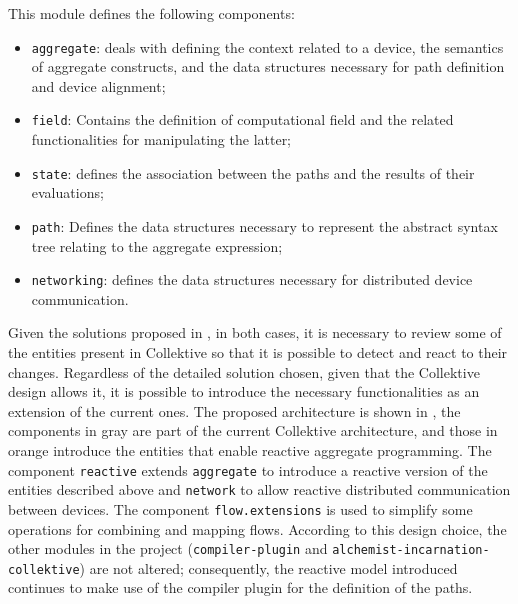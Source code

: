 This module defines the following components:
\begin{itemize}
    \item \texttt{aggregate}: deals with defining the context related to a device, the semantics of aggregate constructs, and the data structures necessary for path definition and device alignment;
    \item \texttt{field}: Contains the definition of computational field and the related functionalities for manipulating the latter;
    \item \texttt{state}: defines the association between the paths and the results of their evaluations;
    \item \texttt{path}: Defines the data structures necessary to represent the abstract syntax tree relating to the aggregate expression;
    \item \texttt{networking}: defines the data structures necessary for distributed device communication.
\end{itemize}

Given the solutions proposed in , in both cases, it is necessary to review some of the entities present in Collektive so that it is possible to detect and react to their changes. Regardless of the detailed solution chosen, given that the Collektive design allows it, it is possible to introduce the necessary functionalities as an extension of the current ones. The proposed architecture is shown in , the components in gray are part of the current Collektive architecture, and those in orange introduce the entities that enable reactive aggregate programming. The component \texttt{reactive} extends \texttt{aggregate} to introduce a reactive version of the entities described above and \texttt{network} to allow reactive distributed communication between devices. The component \texttt{flow.extensions} is used to simplify some operations for combining and mapping flows. According to this design choice, the other modules in the project (\texttt{compiler-plugin} and \texttt{alchemist-incarnation-collektive}) are not altered; consequently, the reactive model introduced continues to make use of the compiler plugin for the definition of the paths.

